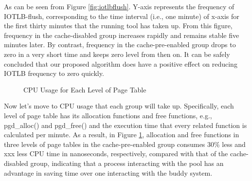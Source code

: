 As can be seen from Figure \ref{fig:iotlbflush}. Y-axis represents the frequency of IOTLB-flush, corresponding to the time interval (i.e., one minute) of x-axis for the first thirty minutes that the running tool has taken up. From this figure, frequency in the cache-disabled group increases rapidly and remains stable five minutes later. By contrast, frequency in the cache-pre-enabled group drops to zero in a very short time and keeps zero level from then on. It can be safely concluded that our proposed algorithm does have a positive effect on reducing IOTLB frequency to zero quickly.

\begin{figure}
\centering
{}
\hspace{1in} 
\hspace{1in} 
\caption{CPU Usage for Each Level of Page Table}
\label{fig:PGtime} %
\end{figure}

Now let’s move to CPU usage that each group will take up. Specifically, each level of page table has its allocation functions and free functions, e.g., pgd\_alloc() and pgd\_free() and the execution time that every related function is calculated per minute. As a result, in Figure \ref{fig:PGtime}, allocation and free functions in three levels of page tables in the cache-pre-enabled group consumes 30\% less and xxx less CPU time in nanoseconds, respectively, compared with that of the cache-disabled group, indicating that a process interacting with the pool has an advantage in saving time over one interacting with the buddy system.

